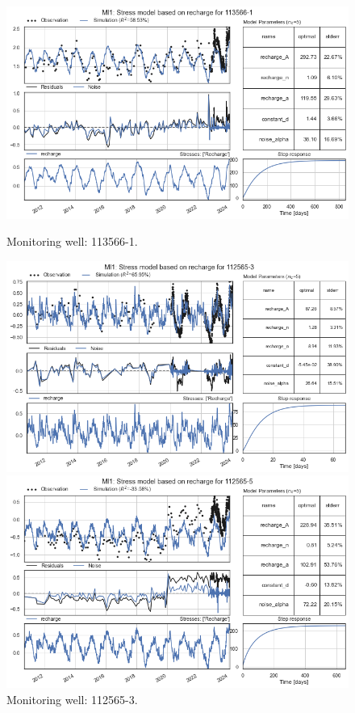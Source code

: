 \begin{figure}[htbp]
    \centering
    \begin{minipage}{0.32\textwidth}
        \centering
        \includegraphics[width=\linewidth]{frontmatter/Rozenburg-fig/4.png}
        \caption{Monitoring well: 113566-1.}
        \label{fig:112565-3}
    \end{minipage}
    \hfill
    \begin{minipage}{0.32\textwidth}
        \centering
        \includegraphics[width=\linewidth]{frontmatter/Rozenburg-fig/5.png}
        \caption{Monitoring well: 112565-3.}
        \label{fig:112565-3}
    \end{minipage}
    \hfill
    \begin{minipage}{0.32\textwidth}
        \centering
        \includegraphics[width=\linewidth]{frontmatter/Rozenburg-fig/6.png}

\end{minipage}
\end{figure}
